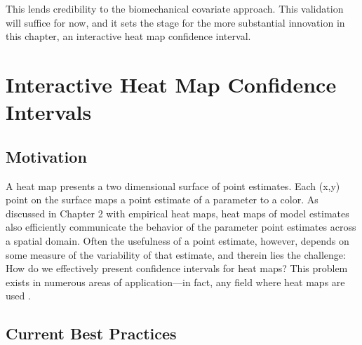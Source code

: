 This lends credibility to the biomechanical covariate approach. This validation will suffice for now, and it sets the stage for the more substantial innovation in this chapter, an interactive heat map confidence interval.

\section{Interactive Heat Map Confidence Intervals}

\subsection{Motivation}

A heat map presents a two dimensional surface of point estimates. Each (x,y) point on the surface maps a point estimate of a parameter to a color. As discussed in Chapter 2 with empirical heat maps, heat maps of model estimates also efficiently communicate the behavior of the parameter point estimates across a spatial domain. Often the usefulness of a point estimate, however, depends on some measure of the variability of that estimate, and therein lies the challenge: How do we effectively present confidence intervals for heat maps? This problem exists in numerous areas of application---in fact, any field where heat maps are used \citep{Emerson}. 

\subsection{Current Best Practices}

